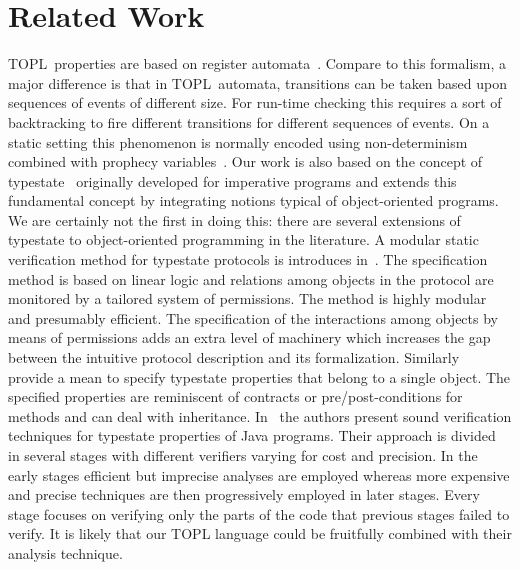 \documentclass{sigplanconf}[10pt] %
\newcommand{\TPL}{TOPL}
\begin{document}
\section{Related Work}\label{sec:related} %
\TPL \ properties are based on register automata~\cite{DBLP:journals/tocl/DemriL09}. Compare to this formalism, a major difference is that in \TPL \ automata, transitions can be taken based upon sequences of events of different size. For run-time checking this requires a sort of backtracking to fire different transitions for different  sequences of events. On a static setting this phenomenon is normally encoded using non-determinism combined with prophecy variables~\cite{AL88}.
%
Our work is also based on the concept of typestate~\cite{strom1986} originally developed for imperative programs and extends this fundamental concept by integrating notions typical of object-oriented programs. 
We are certainly not the first in doing this: there are several extensions of typestate to object-oriented programming in the literature.
A modular static verification method for typestate protocols is introduces in~\cite{dblp:conf/oopsla/bierhoffa07}. 
The specification method is based on linear logic and relations among objects in the protocol are monitored by a tailored system of permissions. 
The method is highly modular and presumably efficient. The specification of the interactions among objects by means of permissions adds an extra level of machinery which increases the gap between the intuitive protocol description and its formalization. Similarly~\cite{deline2004,dblp:conf/sigsoft/BierhoffA05} provide a mean to specify typestate properties that belong to a single object. The specified properties are reminiscent of contracts or pre/post-conditions for methods and
can deal with inheritance.
In~\cite{dblp:conf/issta/FinkYDRG06} the authors present sound verification techniques for typestate properties of Java  programs.
Their approach is divided in several stages with different verifiers varying for cost and precision.
In the early stages efficient but imprecise analyses are employed whereas
more expensive and precise techniques are then progressively employed in later stages.
Every stage focuses on verifying only the parts of the code that previous stages failed to verify.
It is likely that our TOPL language could be fruitfully combined with their analysis technique.
\end{document}
